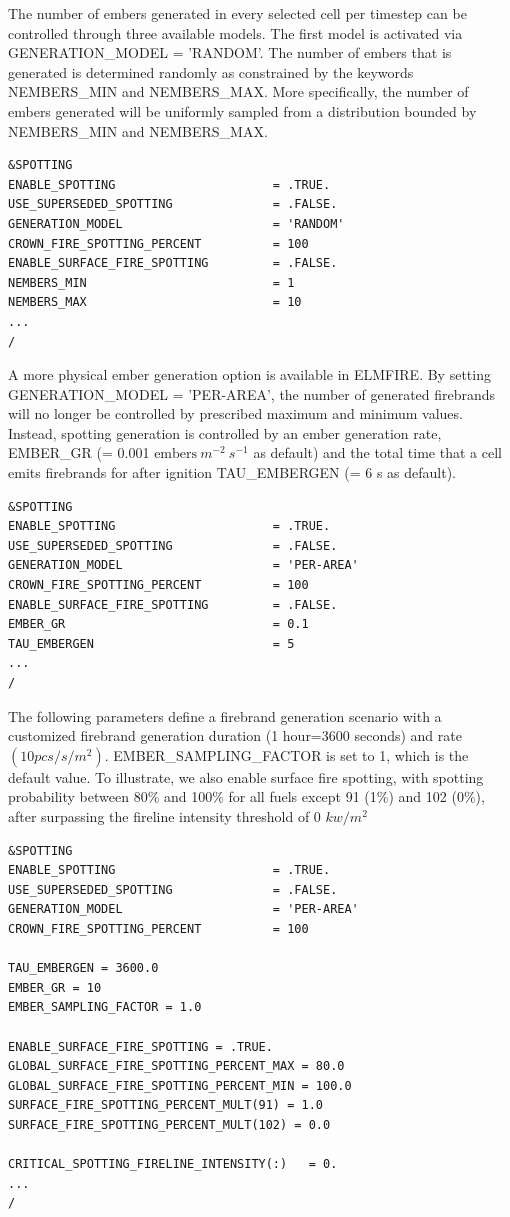 The number of embers generated in every selected cell per timestep can be controlled through three available models. The first model is activated via GENERATION\_MODEL = 'RANDOM'. The number of embers that is generated is determined randomly as constrained by the keywords NEMBERS\_MIN and NEMBERS\_MAX. More specifically, the number of embers generated will be uniformly sampled from a distribution bounded by NEMBERS\_MIN and NEMBERS\_MAX.

\begin{verbatim}
&SPOTTING
ENABLE_SPOTTING 					 = .TRUE.
USE_SUPERSEDED_SPOTTING 			 = .FALSE.
GENERATION_MODEL                     = 'RANDOM'
CROWN_FIRE_SPOTTING_PERCENT 		 = 100
ENABLE_SURFACE_FIRE_SPOTTING         = .FALSE.
NEMBERS_MIN                          = 1
NEMBERS_MAX                          = 10
...
/
\end{verbatim}

A more physical ember generation option is available in ELMFIRE. By setting GENERATION\_MODEL = 'PER-AREA', the number of generated firebrands will no longer be controlled by prescribed maximum and minimum values. Instead, spotting generation is controlled by an ember generation rate, EMBER\_GR (= 0.001 $\text{embers}\:m^{-2}\:s^{-1}$ as default) and the total time that a cell emits firebrands for after ignition TAU\_EMBERGEN (= 6 s as default). 

\begin{verbatim}
&SPOTTING
ENABLE_SPOTTING 					 = .TRUE.
USE_SUPERSEDED_SPOTTING 			 = .FALSE.
GENERATION_MODEL                     = 'PER-AREA'
CROWN_FIRE_SPOTTING_PERCENT 		 = 100
ENABLE_SURFACE_FIRE_SPOTTING         = .FALSE.
EMBER_GR                             = 0.1
TAU_EMBERGEN                         = 5
...
/
\end{verbatim}

The following parameters define a firebrand generation scenario with a customized firebrand generation duration (1 hour=3600 seconds) and rate $(10 pcs/s/m^2)$. EMBER\_SAMPLING\_FACTOR is set to 1, which is the default value. To illustrate, we also enable surface fire spotting, with spotting probability between 80\% and 100\% for all fuels except 91 (1\%) and 102 (0\%), after surpassing the fireline intensity threshold of 0 $kw/m^2$

\begin{verbatim}
&SPOTTING
ENABLE_SPOTTING 					 = .TRUE.
USE_SUPERSEDED_SPOTTING 			 = .FALSE.
GENERATION_MODEL                     = 'PER-AREA'
CROWN_FIRE_SPOTTING_PERCENT 		 = 100

TAU_EMBERGEN = 3600.0
EMBER_GR = 10
EMBER_SAMPLING_FACTOR = 1.0

ENABLE_SURFACE_FIRE_SPOTTING = .TRUE.
GLOBAL_SURFACE_FIRE_SPOTTING_PERCENT_MAX = 80.0
GLOBAL_SURFACE_FIRE_SPOTTING_PERCENT_MIN = 100.0
SURFACE_FIRE_SPOTTING_PERCENT_MULT(91) = 1.0
SURFACE_FIRE_SPOTTING_PERCENT_MULT(102) = 0.0

CRITICAL_SPOTTING_FIRELINE_INTENSITY(:)   = 0.
...
/
\end{verbatim}

